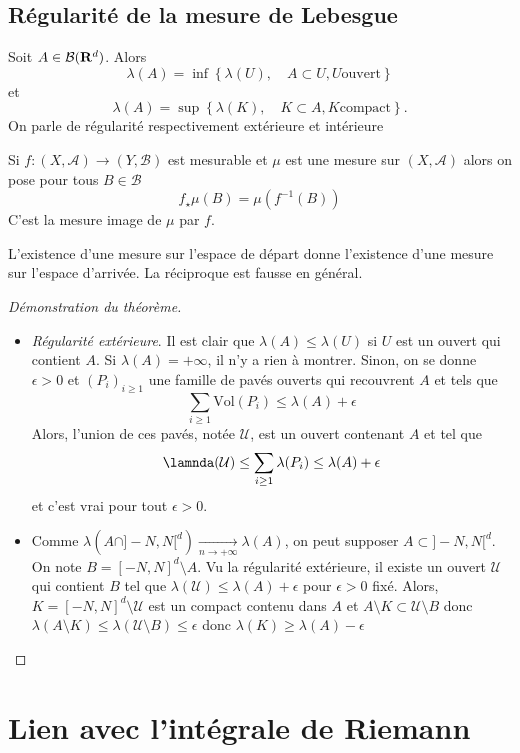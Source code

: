 \subsection{Régularité de la mesure de Lebesgue}

\begin{thm}
    Soit $A \in  \mathcal  B(\mathbf R^d)$. Alors \[
        \lambda(A)=\inf \left\{ \lambda(U), \quad  A\subset U, U \text{ouvert} \right\} 
    \]
    et \[
        \lambda(A)= \sup \left\{ \lambda(K), \quad  K\subset A, K\text{compact} \right\}.
    \]
    On parle de régularité respectivement extérieure et intérieure
\end{thm}

\begin{dfn}
    Si $f:(X, \mathcal  A)\longrightarrow (Y, \mathcal  B)$ est mesurable et $\mu$ est une mesure sur  $(X, \mathcal  A)$ alors on pose pour tous $B \in  \mathcal  B$ \[
        f_\star \mu(B)=\mu(f^{-1} (B))
    \]
    C'est la mesure image de $\mu$ par  $f$.
\end{dfn}

\begin{rem}
L'existence d'une mesure sur l'espace de départ donne l'existence d'une mesure sur l'espace d'arrivée. La réciproque est fausse en général.
\end{rem}

\begin{proof}[Démonstration du théorème]
~
\begin{itemize}
    \item \emph{Régularité extérieure}. Il est clair que $\lambda(A)\leq \lambda(U)$ si $U$ est un ouvert qui contient  $A$. Si $\lambda(A)=+\infty$, il n'y a rien à montrer. Sinon, on se donne  $ \epsilon>0$ et $(P_i)_{i\geq 1}$ une famille de pavés ouverts qui recouvrent $A$ et tels que  \[
            \sum_{i\geq 1} \mathrm{Vol}(P_i) \leq \lambda(A)+\epsilon
    \] 
    Alors, l'union de ces pavés, notée $\mathcal  U$, est un ouvert contenant $A$ et tel que  \[
        \lamnda(\mathcal  U)\leq \sum_{i\geq 1}\lambda(P_i)\leq \lambda(A)+\epsilon
    \] 
    et c'est vrai pour tout $ \epsilon>0$.
\item Comme $\lambda(A\cap ]-N, N[^d) \xrightarrow[n\to+\infty]{}\lambda(A)$, on peut supposer $A\subset ]-N, N[^d$. On note  $B=[-N, N]^d \setminus  A$. Vu la régularité extérieure, il existe un ouvert $\mathcal  U$ qui contient $B$ tel que  $\lambda(\mathcal  U)\leq \lambda(A)+\epsilon$ pour $\epsilon>0$ fixé. Alors, $K=[-N, N]^d \setminus  \mathcal  U$ est un compact contenu dans $A$ et  $A \setminus  K\subset \mathcal U \setminus  B$ donc $\lambda (A \setminus  K)\leq  \lambda (\mathcal  U \setminus  B)\leq  \epsilon$ donc $\lambda(K)\geq \lambda(A)-\epsilon$
\end{itemize}
\end{proof}

\section{Lien avec l'intégrale de Riemann}

